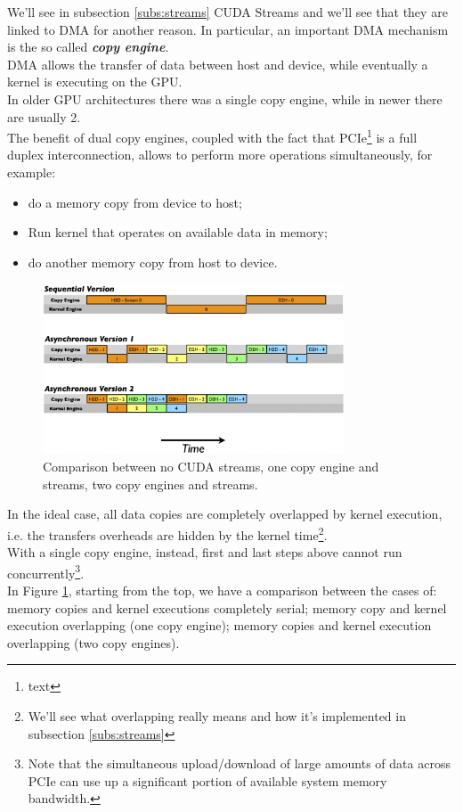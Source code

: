 We'll see in subsection \ref{subs:streams} CUDA Streams and we'll see that they are linked to DMA for another reason.
In particular, an important DMA mechanism is the so called \textbf{\textit{copy engine}}. \\
DMA allows the transfer of data between host and device, while eventually a kernel is executing on the GPU.\\
In older GPU architectures there was a single copy engine, while in newer there are usually 2.\\
The benefit of dual copy engines, coupled with the fact that PCIe\footnote{text} is a full duplex interconnection, allows to perform more operations simultaneously, for example:
\begin{itemize}
	\item do a memory copy from device to host;
	\item Run kernel that operates on available data in memory;
	\item do another memory copy from host to device.
\end{itemize}
\begin{figure}[H]
	\centering
	\includegraphics[width=0.8\textwidth]{images/streams-copy-engine.png}
	\caption{Comparison between no CUDA streams, one copy engine and streams, two copy engines and streams.}
	\label{fig:copyengines}
\end{figure}
In the ideal case, all data copies are completely overlapped by kernel execution, i.e. the transfers overheads are hidden by the kernel time\footnote{We'll see what overlapping really means and how it's implemented in subsection \ref{subs:streams}}.\\
With a single copy engine, instead, first and last steps above cannot run concurrently\footnote{Note that the simultaneous upload/download of large amounts of data across PCIe can use up a significant portion of available system memory bandwidth.}\cite{cudahandbook}.\\
In Figure \ref{fig:copyengines}, starting from the top, we have a comparison between the cases of: memory copies and kernel executions completely serial; memory copy and kernel execution overlapping (one copy engine); memory copies and kernel execution overlapping (two copy engines).\\
	
